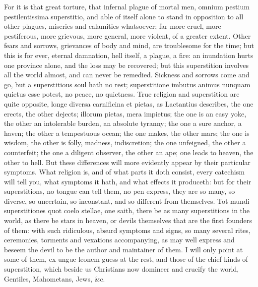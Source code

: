 {For it is that great torture, that infernal plague of mortal men,
omnium pestium pestilentissima superstitio, and able of itself alone to
stand in opposition to all other plagues, miseries and calamities
whatsoever; far more cruel, more pestiferous, more grievous, more
general, more violent, of a greater extent. Other fears and sorrows,
grievances of body and mind, are troublesome for the time; but this is
for ever, eternal damnation, hell itself, a plague, a fire: an
inundation hurts one province alone, and the loss may be recovered; but
this superstition involves all the world almost, and can never be
remedied. Sickness and sorrows come and go, but a superstitious soul
hath no rest; superstitione imbutus animus nunquam quietus esse
potest, no peace, no quietness. True religion and superstition are
quite opposite, longe diversa carnificina et pietas, as Lactantius
describes, the one erects, the other dejects; illorum pietas, mera
impietus; the one is an easy yoke, the other an intolerable burden, an
absolute tyranny; the one a sure anchor, a haven; the other a
tempestuous ocean; the one makes, the other mars; the one is wisdom,
the other is folly, madness, indiscretion; the one unfeigned, the other
a counterfeit; the one a diligent observer, the other an ape; one leads
to heaven, the other to hell. But these differences will more evidently
appear by their particular symptoms. What religion is, and of what
parts it doth consist, every catechism will tell you, what symptoms it
hath, and what effects it produceth: but for their superstitions, no
tongue can tell them, no pen express, they are so many, so diverse, so
uncertain, so inconstant, and so different from themselves. Tot mundi
superstitiones quot coelo stellae, one saith, there be as many
superstitions in the world, as there be stars in heaven, or devils
themselves that are the first founders of them: with such ridiculous,
absurd symptoms and signs, so many several rites, ceremonies, torments
and vexations accompanying, as may well express and beseem the devil to
be the author and maintainer of them. I will only point at some of
them, ex ungue leonem guess at the rest, and those of the chief kinds
of superstition, which beside us Christians now domineer and crucify
the world, Gentiles, Mahometans, Jews, \&c.

}
